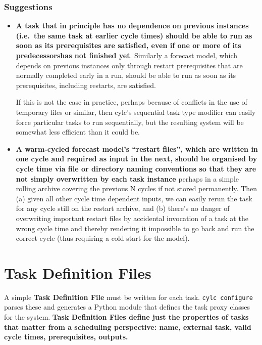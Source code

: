 \documentclass[11pt,a4paper]{article}
\begin{document}
\subsubsection{Suggestions}

\begin{itemize}

    \item {\bf A task that in principle has no dependence on previous
        instances (i.e.\ the same task at earlier cycle times) should be
        able to run as soon as its prerequisites are satisfied, even if
        one or more of its predecessorshas not finished yet}. Similarly
        a forecast model, which depends on previous instances only
        through restart prerequisites that are normally completed early
        in a run, should be able to run as soon as its prerequisites,
        including restarts, are satisfied.

        If this is not the case in practice, perhaps because of
        conflicts in the use of temporary files or similar, then cylc's
        sequential task type modifier can easily force particular tasks
        to run sequentially, but the resulting system will be somewhat
        less efficient than it could be.

    \item {\bf A warm-cycled forecast model's ``restart files'', which
        are written in one cycle and required as input in the next,
        should be organised by cycle time via file or directory naming
        conventions so that they are not simply overwritten by each task
        instance} perhaps in a simple rolling archive covering the
        previous N cycles if not stored permanently. Then (a) given all
        other cycle time dependent inputs, we can easily rerun the task
        for any cycle still on the restart archive, and (b) there's no
        danger of overwriting important restart files by accidental
        invocation of a task at the wrong cycle time and thereby
        rendering it impossible to go back and run the correct cycle
        (thus requiring a cold start for the model).

\end{itemize}

\section{Task Definition Files} 
\label{TaskDefinitionFiles}

A simple {\bf Task Definition File} must be written for each task.
\lstinline=cylc configure= parses these and generates a Python module
that defines the task proxy classes for the system. {\bf Task
Definition Files define just the properties of tasks that matter from a
scheduling perspective: name, external task, valid cycle times,
prerequisites, outputs.} 
\end{document}
